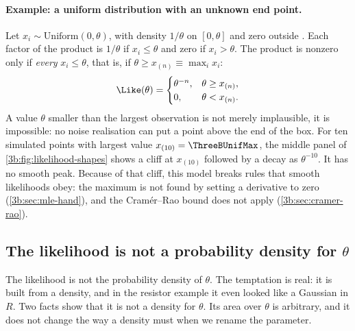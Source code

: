 \paragraph{Example: a uniform distribution with an unknown end point.}
Let $x_i\sim\mathrm{Uniform}(0,\theta)$, with density $1/\theta$ on
$[0,\theta]$ and zero outside . Each factor of
the product is $1/\theta$ if $x_i\le\theta$ and zero if $x_i>\theta$. The
product is nonzero only if \emph{every} $x_i\le\theta$, that is, if
$\theta\ge x_{(n)}\equiv\max_ix_i$:
\[
  \Like(\theta)=
  \begin{cases}
    \theta^{-n}, & \theta\ge x_{(n)},\\
    0,           & \theta< x_{(n)}.
  \end{cases}
\]
A value $\theta$ smaller than the largest observation is not merely
implausible, it is impossible: no noise realisation can put a point above the
end of the box. For ten simulated points with largest value
$x_{(10)}=\ThreeBUnifMax$, the middle panel of
\cref{3b:fig:likelihood-shapes} shows a cliff at $x_{(10)}$ followed by a
decay as $\theta^{-10}$. It has no smooth peak. Because of that cliff, this
model breaks rules that smooth likelihoods obey: the maximum is not found by
setting a derivative to zero (\cref{3b:sec:mle-hand}), and the Cram\'er--Rao
bound does not apply (\cref{3b:sec:cramer-rao}).

\subsection{The likelihood is not a probability density for \texorpdfstring{$\theta$}{theta}}
\label{3b:sec:not-density}

The likelihood is not the probability density of $\theta$. The temptation is
real: it is built from a density, and in the resistor example it even looked
like a Gaussian in $R$. Two facts show that it is not a density for
$\theta$. Its area over $\theta$ is arbitrary, and it does not change the way a
density must when we rename the parameter.

